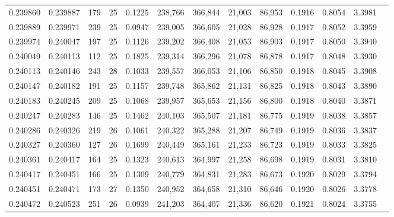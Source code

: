 \begin{tabular}{rrrrrrrrrrrrr}
0.239860 & 0.239887 &   179 &  25 &                                     0.1225 & 238,766 & 366,844 &  21,003 &  86,953 & 0.1916 & 0.8054 & 3.3981 \\
0.239889 & 0.239971 &   239 &  25 &                                     0.0947 & 239,005 & 366,605 &  21,028 &  86,928 & 0.1917 & 0.8052 & 3.3959 \\
0.239974 & 0.240047 &   197 &  25 &                                     0.1126 & 239,202 & 366,408 &  21,053 &  86,903 & 0.1917 & 0.8050 & 3.3940 \\
0.240049 & 0.240113 &   112 &  25 &                                     0.1825 & 239,314 & 366,296 &  21,078 &  86,878 & 0.1917 & 0.8048 & 3.3930 \\
0.240113 & 0.240146 &   243 &  28 &                                     0.1033 & 239,557 & 366,053 &  21,106 &  86,850 & 0.1918 & 0.8045 & 3.3908 \\
0.240147 & 0.240182 &   191 &  25 &                                     0.1157 & 239,748 & 365,862 &  21,131 &  86,825 & 0.1918 & 0.8043 & 3.3890 \\
0.240183 & 0.240245 &   209 &  25 &                                     0.1068 & 239,957 & 365,653 &  21,156 &  86,800 & 0.1918 & 0.8040 & 3.3871 \\
0.240247 & 0.240283 &   146 &  25 &                                     0.1462 & 240,103 & 365,507 &  21,181 &  86,775 & 0.1919 & 0.8038 & 3.3857 \\
0.240286 & 0.240326 &   219 &  26 &                                     0.1061 & 240,322 & 365,288 &  21,207 &  86,749 & 0.1919 & 0.8036 & 3.3837 \\
0.240327 & 0.240360 &   127 &  26 &                                     0.1699 & 240,449 & 365,161 &  21,233 &  86,723 & 0.1919 & 0.8033 & 3.3825 \\
0.240361 & 0.240417 &   164 &  25 &                                     0.1323 & 240,613 & 364,997 &  21,258 &  86,698 & 0.1919 & 0.8031 & 3.3810 \\
0.240417 & 0.240451 &   166 &  25 &                                     0.1309 & 240,779 & 364,831 &  21,283 &  86,673 & 0.1920 & 0.8029 & 3.3794 \\
0.240451 & 0.240471 &   173 &  27 &                                     0.1350 & 240,952 & 364,658 &  21,310 &  86,646 & 0.1920 & 0.8026 & 3.3778 \\
0.240472 & 0.240523 &   251 &  26 &                                     0.0939 & 241,203 & 364,407 &  21,336 &  86,620 & 0.1921 & 0.8024 & 3.3755 \\

\end{tabular}
